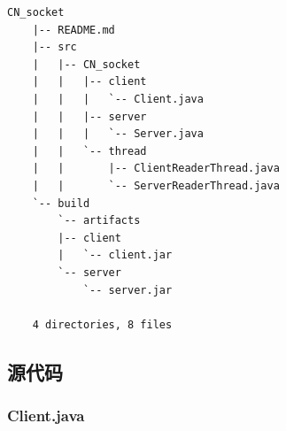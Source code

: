 \documentclass{article}
\begin{document}
	\begin{lstlisting}[numbers=none]
    CN_socket
    |-- README.md
    |-- src
    |   |-- CN_socket
    |   |   |-- client
    |   |   |   `-- Client.java
    |   |   |-- server
    |   |   |   `-- Server.java
    |   |   `-- thread
    |   |       |-- ClientReaderThread.java
    |   |       `-- ServerReaderThread.java
    `-- build
        `-- artifacts
        |-- client
        |   `-- client.jar
        `-- server
            `-- server.jar
    
    4 directories, 8 files
	\end{lstlisting}
	
	\subsection{源代码}
	
	\subsubsection{Client.java}
	
\end{document}
